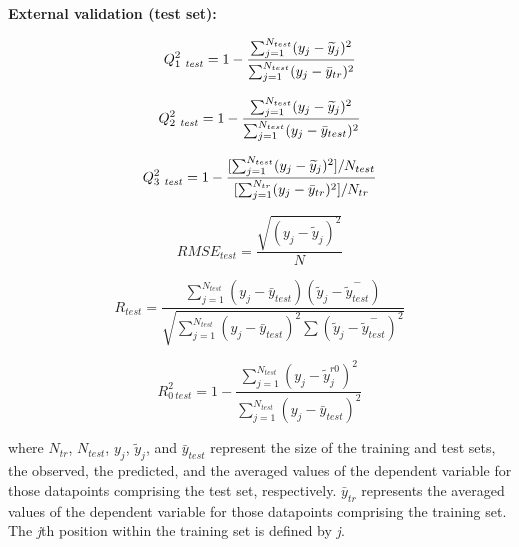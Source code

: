 \documentclass[twoside,a4wide,10pt]{article}
\begin{document}
{\bf External validation (test set):}

\begin{equation}
Q_{1\ {\it test}}^{2} = 1 - \frac {\sum_{j=1}^{N_{test}} (y_j-\widetilde{y}_j)^{2}}  {\sum_{j=1}^{N_{test}} (y_j - \bar{y}_{tr})^{2}}
\end{equation}

\begin{equation}
Q_{2\ {\it test}}^{2} = 1 - \frac {\sum_{j=1}^{N_{test}} (y_j-\widetilde{y}_j)^{2}}  {\sum_{j=1}^{N_{test}} (y_j - \bar{y}_{test})^{2}}
\end{equation}

\begin{equation}
Q_{3\ {\it test}}^{2} = 1 - \frac {[\sum_{j=1}^{N_{test}} (y_j-\widetilde{y}_j)^{2}] / N_{test} }  {[ \sum_{j=1}^{N_{tr}} (y_j - \bar{y}_{tr})^{2}] / N_{tr}}
\end{equation}

\begin{equation}
RMSE_{test} = \frac {\sqrt {(y_j - \widetilde{y}_j)^{2}}} {N} 
\end{equation}

\begin{equation}
R_{test} = \frac {{\sum_{j=1}^{N_{test}} (y_{j} - \bar{y}_{test})}  (\widetilde{y}_{j} - \overset{-}{\widetilde{y}_{test}})} 
{\sqrt{\sum_{j=1}^{N_{test}} (y_{j} - \bar{y}_{test})^{2} \sum{ (\widetilde{y}_{j} - \overset{-}{\widetilde{y}_{test}})^{2}}}}
\end{equation}

\begin{equation}
R_{0\:test}^2 = 1 - \frac {\sum_{j=1}^{N_{test}} (y_{j} - \widetilde{y}_{j}^{ r0})^{2}} {\sum_{j=1}^{N_{test}} (y_{j} - \bar{y}_{test})^{2}} 
\end{equation}

where $N_{tr}$, $N_{test}$, $y_j$, $\widetilde{y}_j$, and $\bar{y}_{test}$ represent the size of the training and test sets, the observed, the predicted, and the averaged values of the dependent variable for those datapoints comprising the test set, respectively.
$\bar{y}_{tr}$ represents the averaged values of the dependent variable for those datapoints comprising the training set.
The {\it j}th position within the training set is defined by {\it j}.\\  
\end{document}

